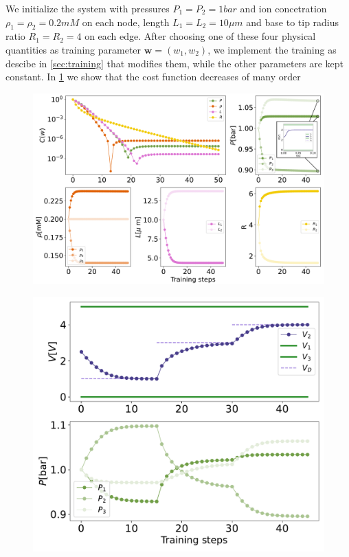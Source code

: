 \documentclass[reprint,superscriptaddress,prb,showkeys]{revtex4-2}
\newcommand{\brac}[1]{\left(#1 \right)} %
\begin{document}
We initialize the system with pressures $P_1 =  P_2 = 1 bar$ and ion concetration $\rho_1 = \rho_2 = 0.2 mM$ on each node, length $L_1 = L_2 = 10\mu m$ and base to tip radius ratio $R_1 = R_2 = 4$ on each edge. After choosing one of these four physical quantities as training parameter $\boldsymbol{w} = \brac{w_1, w_2}$, we implement the training as descibe in \cref{sec:training} that modifies them, while the other parameters are kept constant. 
In \cref{fig:mse_weights_vd} we show that the cost function decreases of many order


\begin{figure}[h]
    \centering
    \includegraphics[width=\columnwidth]{plots/voltage_divider/mse_weights_vd.pdf}
    \caption{}\label{fig:mse_weights_vd}
\end{figure} 

\begin{figure}[h]
    \centering
    \includegraphics[width=0.8\columnwidth]{plots/voltage_divider/evolution_targets.pdf}
    \caption{}\label{fig:evolution_targets}
\end{figure} 
\end{document}

